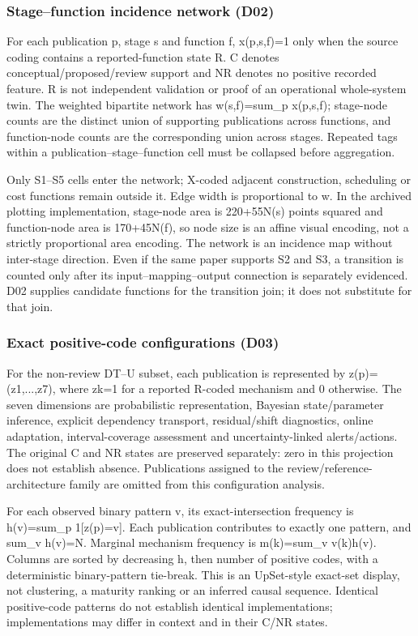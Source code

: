 \subsubsection{Stage–function incidence network (D02)}

For each publication p, stage s and function f, x(p,s,f)=1 only when the source coding contains a reported-function state R. C denotes conceptual/proposed/review support and NR denotes no positive recorded feature. R is not independent validation or proof of an operational whole-system twin. The weighted bipartite network has w(s,f)=sum\_p x(p,s,f); stage-node counts are the distinct union of supporting publications across functions, and function-node counts are the corresponding union across stages. Repeated tags within a publication--stage--function cell must be collapsed before aggregation.

Only S1--S5 cells enter the network; X-coded adjacent construction, scheduling or cost functions remain outside it. Edge width is proportional to w. In the archived plotting implementation, stage-node area is 220+55N(s) points squared and function-node area is 170+45N(f), so node size is an affine visual encoding, not a strictly proportional area encoding. The network is an incidence map without inter-stage direction. Even if the same paper supports S2 and S3, a transition is counted only after its input--mapping--output connection is separately evidenced. D02 supplies candidate functions for the transition join; it does not substitute for that join.

\subsubsection{Exact positive-code configurations (D03)}

For the non-review DT--U subset, each publication is represented by z(p)=(z1,...,z7), where zk=1 for a reported R-coded mechanism and 0 otherwise. The seven dimensions are probabilistic representation, Bayesian state/parameter inference, explicit dependency transport, residual/shift diagnostics, online adaptation, interval-coverage assessment and uncertainty-linked alerts/actions. The original C and NR states are preserved separately: zero in this projection does not establish absence. Publications assigned to the review/reference-architecture family are omitted from this configuration analysis.

For each observed binary pattern v, its exact-intersection frequency is h(v)=sum\_p 1[z(p)=v]. Each publication contributes to exactly one pattern, and sum\_v h(v)=N. Marginal mechanism frequency is m(k)=sum\_v v(k)h(v). Columns are sorted by decreasing h, then number of positive codes, with a deterministic binary-pattern tie-break. This is an UpSet-style exact-set display, not clustering, a maturity ranking or an inferred causal sequence. Identical positive-code patterns do not establish identical implementations; implementations may differ in context and in their C/NR states.

